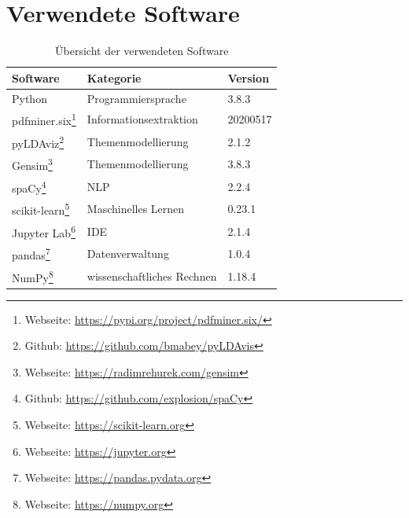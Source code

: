 \section{Verwendete Software}
\label{sec:used-software}

\vspace{3cm}

\begin{savenotes}
    \begin{table}[!ht]
    \centering
        \begin{tabular}{lll}
        \rowcolor[HTML]{FFFFFF} 
        \textbf{Software} & \textbf{Kategorie} & \textbf{Version} \\ \hline
        \rowcolor[HTML]{FFFFFF} 
        Python & Programmiersprache & 3.8.3\\
        \rowcolor[HTML]{EFEFEF} 
        pdfminer.six\footnote{Webseite: \url{https://pypi.org/project/pdfminer.six/}} & Informationsextraktion & 20200517\\
        \rowcolor[HTML]{FFFFFF}
        pyLDAviz\footnote{Github: \url{https://github.com/bmabey/pyLDAvis}} & Themenmodellierung & 2.1.2\\
        \rowcolor[HTML]{EFEFEF} 
        Gensim\footnote{Webseite: \url{https://radimrehurek.com/gensim}} & Themenmodellierung & 3.8.3\\
        \rowcolor[HTML]{FFFFFF} 
        spaCy\footnote{Github: \url{https://github.com/explosion/spaCy}} & NLP & 2.2.4\\
        \rowcolor[HTML]{EFEFEF} 
        scikit-learn\footnote{Webseite: \url{https://scikit-learn.org}} & Maschinelles Lernen & 0.23.1\\
        Jupyter Lab\footnote{Webseite: \url{https://jupyter.org}} & IDE & 2.1.4\\
        \rowcolor[HTML]{EFEFEF} 
        pandas\footnote{Webseite: \url{https://pandas.pydata.org}} & Datenverwaltung & 1.0.4\\
        \rowcolor[HTML]{FFFFFF} 
        NumPy\footnote{Webseite: \url{https://numpy.org}} & wissenschaftliches Rechnen & 1.18.4\\

        \end{tabular}%
    \caption{Übersicht der verwendeten Software}
    \label{tab:used-software}
    \end{table}
\end{savenotes}

\clearpage

